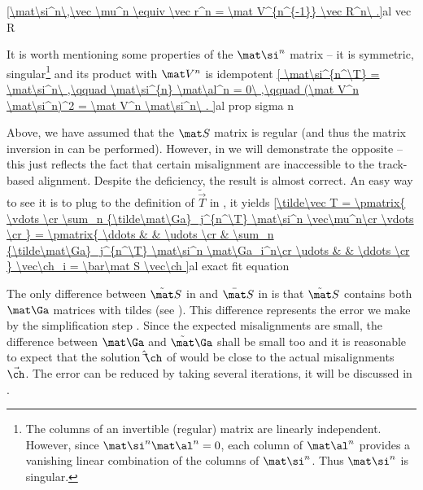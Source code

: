 \eqref{\mat\si^n\,\vec \mu^n \equiv \vec r^n = \mat V^{n^{-1}} \vec R^n\ .}{al vec R}

It is worth mentioning some properties of the $\mat\si^n$ matrix -- it is symmetric, singular\footnote{%
The columns of an invertible (regular) matrix are linearly independent. However, since $\mat\si^{n} \mat\al^n = 0$, each column of $\mat\al^n$ provides a vanishing linear combination of the columns of $\mat\si^n$. Thus $\mat\si^n$ is singular.
} and its product with $\mat V^n$ is idempotent
\eqref{
	\mat\si^{n^\T} = \mat\si^n\ ,\qquad
	\mat\si^{n} \mat\al^n = 0\ ,\qquad
	(\mat V^n \mat\si^n)^2 = \mat V^n \mat\si^n\ .
}{al prop sigma n}

Above, we have assumed that the $\mat S$ matrix is regular (and thus the matrix inversion in  can be performed). However, in  we will demonstrate the opposite -- this just reflects the fact that certain misalignment are inaccessible to the track-based alignment. Despite the deficiency, the result  is almost correct. An easy way to see it is to plug  to the definition of $\tilde\vec T$ in , it yields
\eqref{\tilde\vec T =
\pmatrix{
	\vdots \cr
	\sum_n {\tilde\mat\Ga}_j^{n^\T} \mat\si^n \vec\mu^n\cr
	\vdots \cr
}
=
\pmatrix{
	\ddots & & \udots \cr
	 & \sum_n {\tilde\mat\Ga}_j^{n^\T} \mat\si^n \mat\Ga_i^n\cr
	\udots & & \ddots \cr
}
\vec\ch_i
=
\bar\mat S \vec\ch
}{al exact fit equation}

The only difference between $\tilde\mat S$ in  and $\bar\mat S$ in  is that $\tilde\mat S$ contains both $\mat\Ga$ matrices with tildes (see ). This difference represents the error we make by the simplification step . Since the expected misalignments are small, the difference between $\mat\Ga$ and $\tilde\mat\Ga$ shall be small too and it is reasonable to expect that the solution $\hat\vec\ch$ of  would be close to the actual misalignments $\vec\ch$. The error can be reduced by taking several iterations, it will be discussed in .

